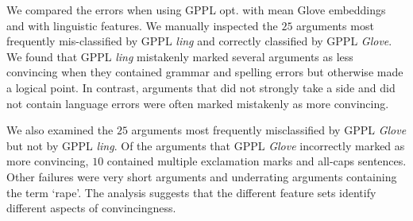 We compared the errors when using GPPL opt. with mean Glove embeddings
and with linguistic features. We
manually inspected the $25$ arguments most frequently
mis-classified by GPPL \emph{ling} and correctly classified by GPPL \emph{Glove}.
We found that GPPL \emph{ling} mistakenly marked several arguments 
as less convincing when they contained grammar and spelling errors but otherwise
made a logical point. 
In contrast, arguments that did not strongly take a side and did not contain 
language errors were often marked mistakenly as more convincing.

We also examined the $25$ arguments most frequently misclassified by GPPL \emph{Glove} but not by GPPL \emph{ling}.
Of the arguments that GPPL \emph{Glove} incorrectly marked as more convincing, 
$10$ contained multiple exclamation marks and all-caps sentences. 
Other failures were very short arguments and underrating arguments containing the term `rape'.
The analysis suggests that the different feature sets identify different aspects of convincingness.


